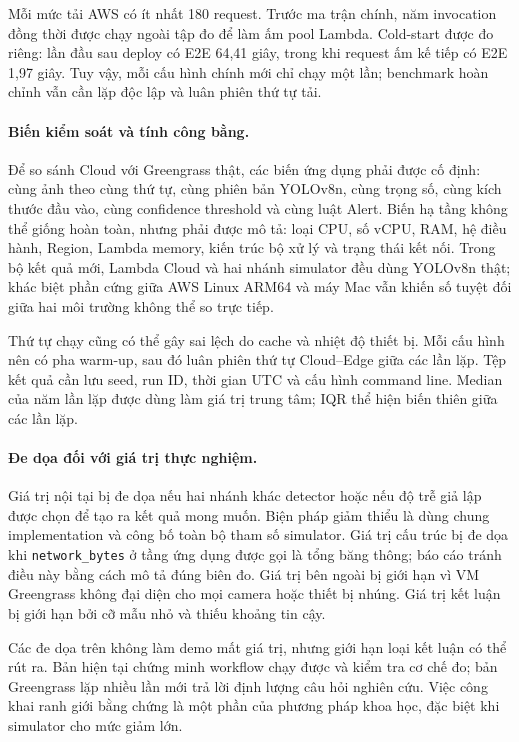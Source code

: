 Mỗi mức tải AWS có ít nhất 180 request. Trước ma trận chính, năm invocation đồng
thời được chạy ngoài tập đo để làm ấm pool Lambda. Cold-start được đo riêng: lần
đầu sau deploy có E2E 64,41 giây, trong khi request ấm kế tiếp có E2E 1,97 giây.
Tuy vậy, mỗi cấu hình chính mới chỉ chạy một lần; benchmark hoàn chỉnh vẫn cần lặp
độc lập và luân phiên thứ tự tải.

\paragraph{Biến kiểm soát và tính công bằng.}

Để so sánh Cloud với Greengrass thật, các biến ứng dụng phải được cố định: cùng ảnh
theo cùng thứ tự, cùng phiên bản YOLOv8n, cùng trọng số, cùng kích thước đầu vào,
cùng confidence threshold và cùng luật Alert. Biến hạ tầng không thể giống hoàn
toàn, nhưng phải được mô tả: loại CPU, số vCPU, RAM, hệ điều hành, Region, Lambda
memory, kiến trúc bộ xử lý và trạng thái kết nối. Trong bộ kết quả mới, Lambda
Cloud và hai nhánh simulator đều dùng YOLOv8n thật; khác biệt phần cứng giữa AWS
Linux ARM64 và máy Mac vẫn khiến số tuyệt đối giữa hai môi trường không thể so
trực tiếp.

Thứ tự chạy cũng có thể gây sai lệch do cache và nhiệt độ thiết bị. Mỗi cấu hình
nên có pha warm-up, sau đó luân phiên thứ tự Cloud--Edge giữa các lần lặp. Tệp kết
quả cần lưu seed, run ID, thời gian UTC và cấu hình command line. Median của năm
lần lặp được dùng làm giá trị trung tâm; IQR thể hiện biến thiên giữa các lần lặp.

\paragraph{Đe dọa đối với giá trị thực nghiệm.}

Giá trị nội tại bị đe dọa nếu hai nhánh khác detector hoặc nếu độ trễ giả lập được
chọn để tạo ra kết quả mong muốn. Biện pháp giảm thiểu là dùng chung implementation
và công bố toàn bộ tham số simulator. Giá trị cấu trúc bị đe dọa khi
\texttt{network\_bytes} ở tầng ứng dụng được gọi là tổng băng thông; báo cáo tránh
điều này bằng cách mô tả đúng biên đo. Giá trị bên ngoài bị giới hạn vì VM
Greengrass không đại diện cho mọi camera hoặc thiết bị nhúng. Giá trị kết luận bị
giới hạn bởi cỡ mẫu nhỏ và thiếu khoảng tin cậy.

Các đe dọa trên không làm demo mất giá trị, nhưng giới hạn loại kết luận có thể rút
ra. Bản hiện tại chứng minh workflow chạy được và kiểm tra cơ chế đo; bản
Greengrass lặp nhiều lần mới trả lời định lượng câu hỏi nghiên cứu. Việc công khai
ranh giới bằng chứng là một phần của phương pháp khoa học, đặc biệt khi simulator
cho mức giảm lớn.


